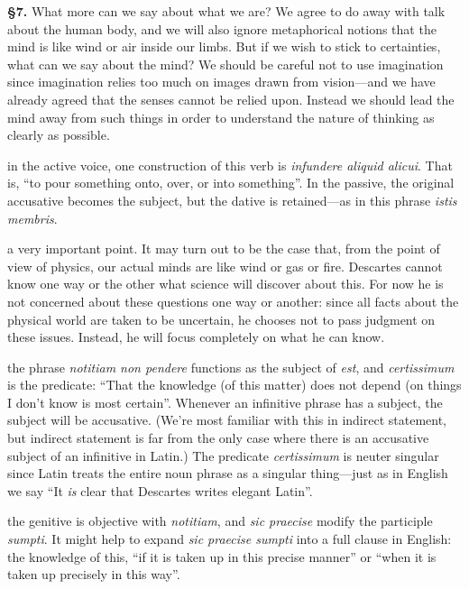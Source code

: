 \prenotes

\textbf{§7.} What more can we say about what we are? We agree to do away with talk about the human body, and we will also ignore metaphorical notions that the mind is like wind or air inside our limbs. But if we wish to stick to certainties, what can we say about the mind? We should be careful not to use imagination since imagination relies too much on images drawn from vision---and we have already agreed that the senses cannot be relied upon. Instead we should lead the mind away from such things in order to understand the nature of thinking as clearly as possible.

 in the active voice, one construction of this verb is \textit{infundere aliquid alicui}. That is, ``to pour something onto, over, or into something''. In the passive, the original accusative becomes the subject, but the dative is retained---as in this phrase \textit{istis membris}.

 a very important point. It may turn out to be the case that, from the point of view of physics, our actual minds are like wind or gas or fire. Descartes cannot know one way or the other what science will discover about this. For now he is not concerned about these questions one way or another: since all facts about the physical world are taken to be uncertain, he chooses not to pass judgment on these issues. Instead, he will focus completely on what he can know.

 the phrase \textit{notitiam non pendere} functions as the subject of \textit{est}, and \textit{certissimum} is the predicate: ``That the knowledge (of this matter) does not depend (on things I don't know is most certain''. Whenever an infinitive phrase has a subject, the subject will be accusative. (We're most familiar with this in indirect statement, but indirect statement is far from the only case where there is an accusative subject of an infinitive in Latin.) The predicate \textit{certissimum} is neuter singular since Latin treats the entire noun phrase as a singular thing---just as in English we say ``It \textit{is} clear that Descartes writes elegant Latin''.

 the genitive is objective with \textit{notitiam}, and \textit{sic praecise} modify the participle \textit{sumpti}. It might help to expand \textit{sic praecise sumpti} into a full clause in English: the knowledge of this, ``if it is taken up in this precise manner'' or ``when it is taken up precisely in this way''.


